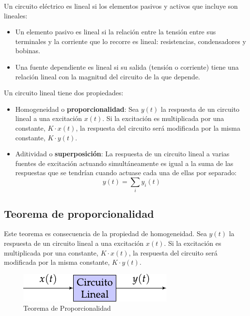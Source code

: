 Un circuito eléctrico es lineal si los elementos pasivos y activos que
incluye son lineales:
\begin{itemize}
\item Un elemento pasivo es lineal si la relación entre la tensión
  entre sus terminales y la corriente que lo recorre es lineal:
  resistencias, condensadores y bobinas.
\item Una fuente dependiente es lineal si su salida (tensión o
  corriente) tiene una relación lineal con la magnitud del circuito de
  la que depende.
\end{itemize}
Un circuito lineal tiene dos propiedades:
\begin{itemize}
\item Homogeneidad o \textbf{proporcionalidad}: Sea $y(t)$ la
  respuesta de un circuito lineal a una excitación $x(t)$. Si la
  excitación es multiplicada por una constante, $K\cdot x(t)$, la
  respuesta del circuito será modificada por la misma constante,
  $K \cdot y(t)$.
\item Aditividad o \textbf{superposición}: La respuesta de un circuito
  lineal a varias fuentes de excitación actuando simultáneamente es
  igual a la suma de las respuestas que se tendrían cuando actuase
  cada una de ellas por separado:
  \begin{equation*}
    y(t)=\sum_i y_i(t)
  \end{equation*}
\end{itemize}

\subsection{Teorema de proporcionalidad}
\label{sec:proporcionalidad}

Este teorema es consecuencia de la propiedad de homogeneidad. Sea $y(t)$ la respuesta de un circuito lineal a una excitación $x(t)$.  Si la excitación es multiplicada por una constante, $K \cdot x(t)$, la respuesta del circuito será modificada por la misma constante, $K \cdot y(t)$.

\begin{figure}[H]
  \centering
  \includegraphics{../figs/proporcionalidad.pdf}
  \caption{Teorema de Proporcionalidad}
  \label{fig:superposicion_cc}
\end{figure}

